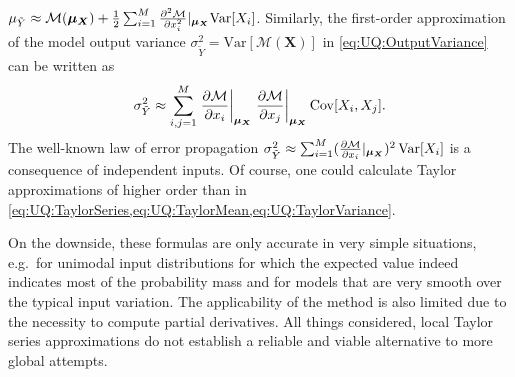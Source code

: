 \(\mu_{\tilde{Y}} \approx \mathcal{M}(\bm{\mu}_{\bm{X}}) + \frac{1}{2} \sum_{i=1}^M \frac{\partial^2 \mathcal{M}}{\partial x_i^2} \rvert_{\bm{\mu}_{\bm{X}}} \mathrm{Var}[X_i]\).
Similarly, the first-order approximation of the model output variance \(\sigma_{\tilde{Y}}^2 = \mathrm{Var}[\mathcal{M}(\bm{X})]\) in \cref{eq:UQ:OutputVariance} can be written as
\begin{equation} \label{eq:UQ:TaylorVariance}
  \sigma_{\tilde{Y}}^2 \approx \sum\limits_{i,j=1}^M \left. \frac{\partial \mathcal{M}}{\partial x_i} \right\rvert_{\bm{\mu}_{\bm{X}}}
  \left. \frac{\partial \mathcal{M}}{\partial x_j} \right\rvert_{\bm{\mu}_{\bm{X}}} \mathrm{Cov}[X_i,X_j].
\end{equation}
The well-known law of error propagation \(\sigma_{\tilde{Y}}^2 \approx \sum_{i=1}^M (\frac{\partial \mathcal{M}}{\partial x_i} \rvert_{\bm{\mu}_{\bm{X}}})^2 \, \mathrm{Var}[X_i]\)
is a consequence of independent inputs.
Of course, one could calculate Taylor approximations of higher order than in \cref{eq:UQ:TaylorSeries,eq:UQ:TaylorMean,eq:UQ:TaylorVariance}.
\par %
On the downside, these formulas are only accurate in very simple situations,
e.g.\ for unimodal input distributions for which the expected value indeed indicates most of the probability mass and for models that are very smooth over the typical input variation.
The applicability of the method is also limited due to the necessity to compute partial derivatives.
All things considered, local Taylor series approximations do not establish a reliable and viable alternative to more global attempts.